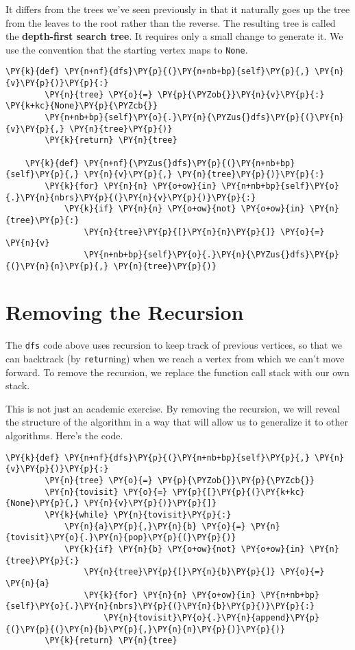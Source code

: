 It differs from the trees we've seen previously in that it naturally goes up the tree from the leaves to the root rather than the reverse.
The resulting tree is called the \textbf{depth-first search tree}.
It requires only a small change to generate it.
We use the convention that the starting vertex maps to \texttt{None}.

\begin{Verbatim}[commandchars=\\\{\}]
    \PY{k}{def} \PY{n+nf}{dfs}\PY{p}{(}\PY{n+nb+bp}{self}\PY{p}{,} \PY{n}{v}\PY{p}{)}\PY{p}{:}
        \PY{n}{tree} \PY{o}{=} \PY{p}{\PYZob{}}\PY{n}{v}\PY{p}{:} \PY{k+kc}{None}\PY{p}{\PYZcb{}}
        \PY{n+nb+bp}{self}\PY{o}{.}\PY{n}{\PYZus{}dfs}\PY{p}{(}\PY{n}{v}\PY{p}{,} \PY{n}{tree}\PY{p}{)}
        \PY{k}{return} \PY{n}{tree}

    \PY{k}{def} \PY{n+nf}{\PYZus{}dfs}\PY{p}{(}\PY{n+nb+bp}{self}\PY{p}{,} \PY{n}{v}\PY{p}{,} \PY{n}{tree}\PY{p}{)}\PY{p}{:}
        \PY{k}{for} \PY{n}{n} \PY{o+ow}{in} \PY{n+nb+bp}{self}\PY{o}{.}\PY{n}{nbrs}\PY{p}{(}\PY{n}{v}\PY{p}{)}\PY{p}{:}
            \PY{k}{if} \PY{n}{n} \PY{o+ow}{not} \PY{o+ow}{in} \PY{n}{tree}\PY{p}{:}
                \PY{n}{tree}\PY{p}{[}\PY{n}{n}\PY{p}{]} \PY{o}{=} \PY{n}{v}
                \PY{n+nb+bp}{self}\PY{o}{.}\PY{n}{\PYZus{}dfs}\PY{p}{(}\PY{n}{n}\PY{p}{,} \PY{n}{tree}\PY{p}{)}
\end{Verbatim}


\section{Removing the Recursion}


The \texttt{dfs} code above uses recursion to keep track of previous vertices, so that we can backtrack (by \texttt{return}ing) when we reach a vertex from which we can't move forward.
To remove the recursion, we replace the function call stack with our own stack.


This is not just an academic exercise.
By removing the recursion, we will reveal the structure of the algorithm in a way that will allow us to generalize it to other algorithms.
Here's the code.

\begin{Verbatim}[commandchars=\\\{\}]
    \PY{k}{def} \PY{n+nf}{dfs}\PY{p}{(}\PY{n+nb+bp}{self}\PY{p}{,} \PY{n}{v}\PY{p}{)}\PY{p}{:}
        \PY{n}{tree} \PY{o}{=} \PY{p}{\PYZob{}}\PY{p}{\PYZcb{}}
        \PY{n}{tovisit} \PY{o}{=} \PY{p}{[}\PY{p}{(}\PY{k+kc}{None}\PY{p}{,} \PY{n}{v}\PY{p}{)}\PY{p}{]}
        \PY{k}{while} \PY{n}{tovisit}\PY{p}{:}
            \PY{n}{a}\PY{p}{,}\PY{n}{b} \PY{o}{=} \PY{n}{tovisit}\PY{o}{.}\PY{n}{pop}\PY{p}{(}\PY{p}{)}
            \PY{k}{if} \PY{n}{b} \PY{o+ow}{not} \PY{o+ow}{in} \PY{n}{tree}\PY{p}{:}
                \PY{n}{tree}\PY{p}{[}\PY{n}{b}\PY{p}{]} \PY{o}{=} \PY{n}{a}
                \PY{k}{for} \PY{n}{n} \PY{o+ow}{in} \PY{n+nb+bp}{self}\PY{o}{.}\PY{n}{nbrs}\PY{p}{(}\PY{n}{b}\PY{p}{)}\PY{p}{:}
                    \PY{n}{tovisit}\PY{o}{.}\PY{n}{append}\PY{p}{(}\PY{p}{(}\PY{n}{b}\PY{p}{,}\PY{n}{n}\PY{p}{)}\PY{p}{)}
        \PY{k}{return} \PY{n}{tree}
\end{Verbatim}


